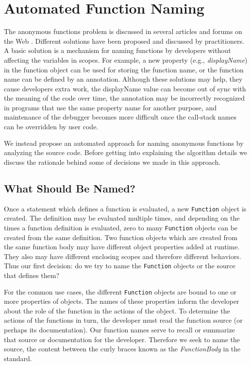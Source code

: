 \documentclass[10pt, preprint]{sigplanconf}
\begin{document}
\section{Automated Function Naming}
The anonymous functions problem is discussed in several articles and forums on the Web \cite{DisplayName, Zaytsev}. Different solutions have been proposed and discussed by practitioners. A basic solution is a mechanism for naming functions by developers without affecting the variables in scopes. For example, a new property (e.g., \textit{displayName}) in the function object can be used for storing the function name, or the function name can be defined by an annotation. Although these solutions may help, they cause developers extra work, the displayName value can become out of sync with the meaning of the code over time,  the annotation may be incorrectly recognized in programs that use the same property name for another purpose, and maintenance of the debugger becomes more difficult once the call-stack names can be overridden by user code.

We instead propose an automated approach for naming anonymous functions by analyzing the source code. Before getting into explaining the algorithm details we discuss the rationale behind some of decisions we made in this approach.

\subsection{What Should Be Named?}

Once a statement which defines a function is evaluated, a new \verb|Function| 
object is created.  The definition may be evaluated multiple times, and depending on the times a function definition is evaluated, 
zero to many \verb|Function| objects can be created from the same definition. 
Two function objects which are created from the same function body may have different object properties added at runtime. They also may have different enclosing scopes and therefore different behaviors.  Thus our first 
decision: do we try to name the \verb|Function| objects or the source that defines them?

For the common use cases, the different \verb|Function| objects are bound to one or more properties of objects. The  names of these properties inform the developer about the role of the function in the actions of the object.  To determine the actions of the functions in turn, the developer must read the function source (or perhaps its documentation). Our function names serve to recall or summarize that source or documentation for the developer. Therefore we seek to name the source, the content between the curly braces known as the {\textit{FunctionBody}} in the standard\cite{ECMA}.
\end{document}
